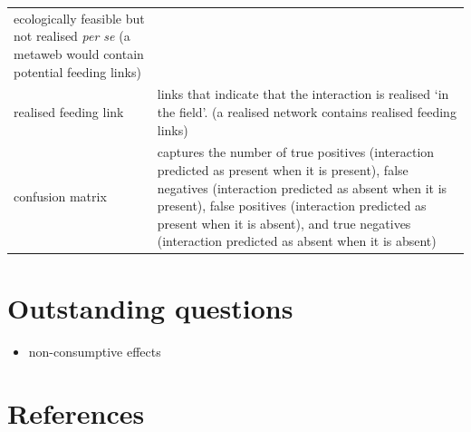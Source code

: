 \documentclass[
]{article}
\providecommand{\tightlist}{%
  \setlength{\itemsep}{0pt}\setlength{\parskip}{0pt}}\usepackage{longtable,booktabs,array}
\begin{document}
\begin{longtable}[]{@{}
  >{\raggedright\arraybackslash}p{}
  >{\raggedright\arraybackslash}p{}@{}}
ecologically feasible but not realised \emph{per se} (a metaweb would
contain potential feeding links) \\
realised feeding link & links that indicate that the interaction is
realised `in the field'. (a realised network contains realised feeding
links) \\
confusion matrix & captures the number of true positives (interaction
predicted as present when it is present), false negatives (interaction
predicted as absent when it is present), false positives (interaction
predicted as present when it is absent), and true negatives (interaction
predicted as absent when it is absent) \\
\end{longtable}

\section*{Outstanding questions}\label{outstanding-questions}

\begin{itemize}
\tightlist
\item
  non-consumptive effects
\end{itemize}

\section*{References}\label{references}
\end{document}
